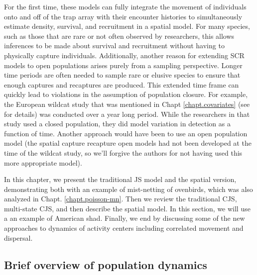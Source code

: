 For the first time, these models can fully
integrate the movement of individuals onto and off of the trap array
with their encounter histories to simultaneously estimate density,
survival, and recruitment in a spatial model.
For many species, such
as those that are rare or not often observed by researchers, this allows 
inferences to be made about survival and recruitment without having
to physically capture individuals.
Additionally, another reason for
extending SCR models to open populations arises purely from a
sampling perspective.  Longer time periods are often needed to sample
rare or elusive species to ensure that enough captures and recaptures
are produced.  This extended time frame can quickly lead to violations
in the assumption of population closure.  For example, the European
wildcat study that was mentioned in Chapt \ref{chapt.covariates} (see
\citet{kery_etal:2011} for details) was
conducted over a year long period.  While the researchers in that
study used a closed population, they did model variation in detection
as a function of time.  Another approach would have been to use an
open population model (the spatial capture recapture open models had
not been developed at the time of the wildcat study, so we'll forgive
the authors for not having used this more appropriate model).

In this chapter, we present the traditional JS model and 
the spatial version, demonstrating both with an example of mist-netting of ovenbirds,  
which was also analyzed in Chapt. \ref{chapt.poisson-mn}.  Then we review the
traditional CJS, multi-state CJS, and then describe the spatial model.  In this 
section, we will use a an example of American shad.  Finally, we end by discussing
some of the new approaches to dynamics of activity centers including correlated 
movement and dispersal.



\subsection{Brief overview of population dynamics}

